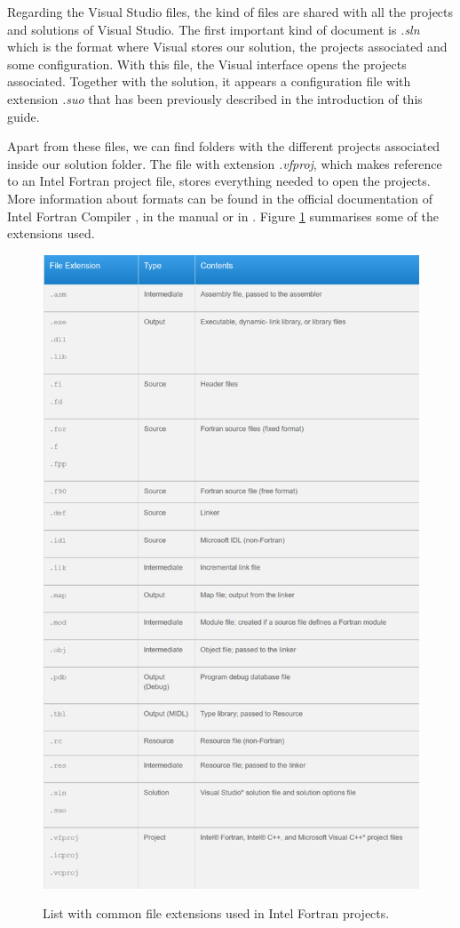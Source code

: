 \begin{enumerate}
	Regarding the Visual Studio files, the kind of files are shared with all the projects and solutions of Visual Studio. The first important kind of document is \textit{.sln} which is the format where Visual stores our solution, the projects associated and some configuration. With this file, the Visual interface opens the projects associated. Together with the solution, it appears a configuration file with extension \textit{.suo} that has been previously described in the introduction of this guide.  
    
    Apart from these files, we can find folders with the different projects associated inside our solution folder. The file with extension \textit{.vfproj}, which makes reference to an Intel Fortran project file, stores everything needed to open the projects. More information about formats can be found in the official documentation of Intel Fortran Compiler \citep{format}, in the manual \citep{manual} or in \citep{format2}. Figure \ref{fig:Formats} summarises some of the extensions used.
    
    \begin{figure}[h]
        \centering
        \caption{List with common file extensions used in Intel Fortran projects.}
        \includegraphics[width= 0.9 \textwidth]{Figures/Formats}
        \label{fig:Formats}
    \end{figure}




\end{enumerate}
